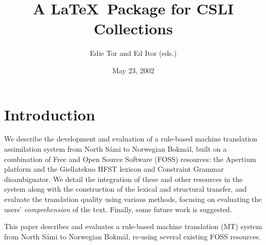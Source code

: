 \documentclass{book}
\title{A \LaTeX\ Package for CSLI Collections}    %
\author{Edie Tor and Ed Itor (eds.)}              %
\date{May 23, 2002}                               %
\begin{document}
\frontmatter      %

\maketitle

\setcounter{page}{5}
\setcounter{tocdepth}{0}  %


\mainmatter



\newcommand{\href}[2]{{\tt #1}} %
\newcommand{\sme}{{\tt sme}}
\newcommand{\nob}{{\tt nob}}
\newcommand{\smenob}{\sme$\rightarrow{}$\nob}
\newcommand{\nobsme}{\nob$\rightarrow{}$\sme}



\section{Introduction} %
  
We describe the development and evaluation of a rule-based machine
translation assimilation system from North S\'{a}mi to Norwegian
Bokm{\aa}l, built on a combination of Free and Open Source Software
(FOSS) resources: the Apertium platform and the Giellatekno HFST
lexicon and Constraint Grammar disambiguator. We detail the
integration of these and other resources in the system along with the
construction of the lexical and structural transfer, and evaluate the
translation quality using various methods, focusing on evaluating the
users' \textit{comprehension} of the text. Finally, some future work
is suggested.


This paper describes and evaluates a rule-based machine translation
(MT) system from North S\'{a}mi to Norwegian Bokm{\aa}l, re-using
several existing FOSS resources. 
\end{document}
